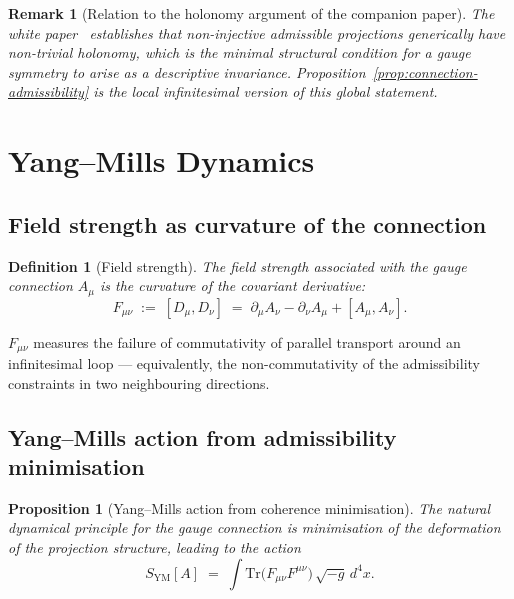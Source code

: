\documentclass[11pt,a4paper]{article}
\newtheorem{proposition}[theorem]{Proposition}
\newtheorem{definition}[theorem]{Definition}
\newtheorem{remark}[theorem]{Remark}
\begin{document}
      \begin{remark}[Relation to the holonomy argument of the companion paper]
        The white paper~\cite{Cosmochrony} establishes that non-injective admissible
        projections generically have non-trivial holonomy, which is the minimal
        structural condition for a gauge symmetry to arise as a descriptive invariance.
        Proposition~\ref{prop:connection-admissibility} is the local infinitesimal
        version of this global statement.
      \end{remark}

  \section{Yang--Mills Dynamics}
    \label{sec:ym}

    \subsection{Field strength as curvature of the connection}

      \begin{definition}[Field strength]
        \label{def:field-strength}
        The \emph{field strength} associated with the gauge connection $A_\mu$ is
        the curvature of the covariant derivative:
        \begin{equation}
          \label{eq:field-strength}
          F_{\mu\nu} \;:=\; [D_\mu, D_\nu]
          \;=\; \partial_\mu A_\nu - \partial_\nu A_\mu + [A_\mu, A_\nu].
        \end{equation}
      \end{definition}

      $F_{\mu\nu}$ measures the failure of commutativity of parallel transport around
      an infinitesimal loop — equivalently, the non-commutativity of the admissibility
      constraints in two neighbouring directions.

    \subsection{Yang--Mills action from admissibility minimisation}

      \begin{proposition}[Yang--Mills action from coherence minimisation]
        \label{prop:ym-action}
        The natural dynamical principle for the gauge connection is minimisation
        of the deformation of the projection structure, leading to the action
        \begin{equation}
          \label{eq:ym-action}
          S_{\mathrm{YM}}[A]
          \;=\; \int \mathrm{Tr}\bigl(F_{\mu\nu} F^{\mu\nu}\bigr)\,\sqrt{-g}\,d^4x.
        \end{equation}
      \end{proposition}
\end{document}
